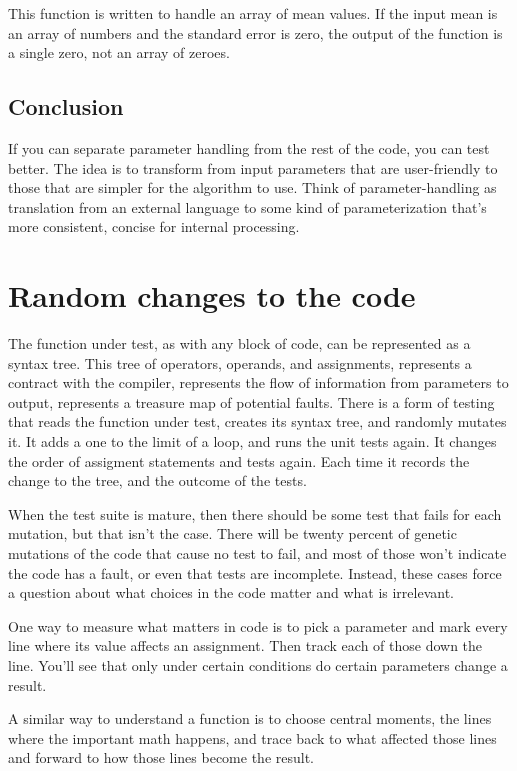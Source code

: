 \documentclass[fleqn,10pt]{olplainarticle}
\begin{document}
This function is written to handle an array of mean values.
If the input mean is an array of numbers and the standard error
is zero, the output of the function is a single zero, not an array
of zeroes.

\subsection{Conclusion}
If you can separate parameter handling from the rest of the code,
you can test better. The idea is to transform from input parameters
that are user-friendly to those that are simpler for the algorithm
to use.
Think of parameter-handling as translation from an external
     language to some kind of parameterization that's more
     consistent, concise for internal processing.


\section{Random changes to the code}\label{sec:random-changes}
The function under test, as with any block of code, can be
represented as a syntax tree. This tree of operators, operands,
and assignments, represents a contract with the compiler,
represents the flow of information from parameters to output,
represents a treasure map of potential faults. There is a form
of testing that reads the function under test, creates its
syntax tree, and randomly mutates it. It adds a one to the
limit of a loop, and runs the unit tests again. It changes
the order of assigment statements and tests again. Each time
it records the change to the tree, and the outcome of the tests.

When the test suite is mature, then there should be some test
that fails for each mutation, but that isn't the case. There
will be twenty percent of genetic mutations of the code that
cause no test to fail, and most of those won't indicate the
code has a fault, or even that tests are incomplete. Instead,
these cases force a question about what choices in the code
matter and what is irrelevant.

One way to measure what matters in code is to pick a
parameter and mark every line where its value affects
an assignment. Then track each of those down the line.
You'll see that only under certain conditions do certain
parameters change a result.

A similar way to understand a function is to choose central
moments, the lines where the important math happens, and
trace back to what affected those lines and forward to
how those lines become the result.
\end{document}
